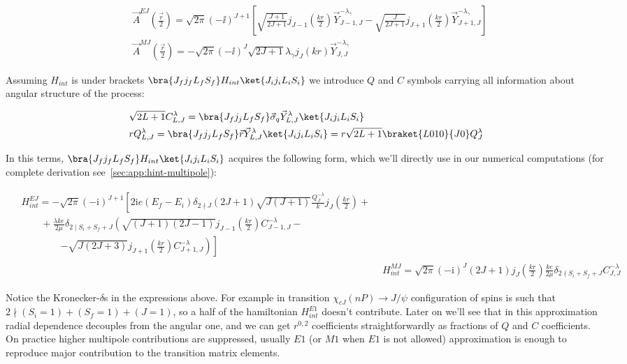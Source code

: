 \begin{align}
    &\vec{A}^{EJ}(\frac{\vec{r}}{2}) = \sqrt{2\pi} (-\ii)^{J+1} \left[ \sqrt{\frac{J+1}{2J+1}} j_{J-1}(\frac{kr}{2}) \vec{Y}^{-\lambda_\gamma}_{J-1, J} - \sqrt{\frac{J}{2J+1}} j_{J+1}(\frac{kr}{2}) \vec{Y}^{-\lambda_\gamma}_{J+1, J} \right] \\
    &\vec{A}^{MJ}(\frac{\vec{r}}{2}) = -\sqrt{2\pi} (-\ii)^J \sqrt{2J+1} \lambda_\gamma j_J(k r) \vec{Y}^{-\lambda_\gamma}_{J,J}
\end{align}

Assuming $H_{int}$ is under brackets $\bra{J_f j_f L_f S_f} H_{int} \ket{J_i j_i L_i S_i}$  we introduce $Q$ and $C$ symbols carrying all information about angular structure of the process:

\begin{align}
    &\sqrt{2L+1} C^\lambda_{L, J} = \bra{J_f j_j L_f S_f} \vec{\sigma}_q \vec{Y}^{\lambda}_{L, J} \ket{J_i j_i L_i S_i} \\
    &r Q^{\lambda}_{L, J} = \bra{J_f j_j L_f S_f} \vec{r} \vec{Y}^{\lambda}_{L, J} \ket{J_i j_i L_i S_i} = r \sqrt{2L+1} \braket{L010}{J0} Q^\lambda_J
\end{align}

In this terms, $\bra{J_f j_f L_f S_f} H_{int} \ket{J_i j_i L_i S_i}$ acquires the following form, which we'll directly use in our numerical computations (for complete derivation see~\cref{sec:app:hint-multipole}):

\begin{align}
    \begin{split}
        &H_{int}^{EJ} = -\sqrt{2\pi} (- \mathrm{i})^{J+1} \left[ 2 \mathrm{i} e (E_f-E_i) \delta_{2 \nmid J} (2J+1) \sqrt{J(J+1)} \frac{Q_{J}^{- \lambda}}{k} j_{J}(\frac{kr}{2}) + \right.\\
        &\qquad +  \frac{\lambda k e}{2 \mu} \delta_{2 \mid S_i + S_f + J} \left(  \sqrt{(J+1)(2J-1)} j_{J-1}(\frac{kr}{2}) C_{J-1, J}^{- \lambda} -\right. \\
        &\qquad\qquad\left.\left.- \sqrt{J(2J+3)} j_{J+1}(\frac{kr}{2}) C_{J+1, J}^{- \lambda} \right) \right]
    \end{split} \\
    &H_{int}^{MJ} = \sqrt{2\pi} (- \mathrm{i})^{J} (2J+1) j_J(\frac{kr}{2}) \frac{k e}{2 \mu} \delta_{2 \nmid S_i + S_f +J} C_{J, J}^{- \lambda}
\end{align}

Notice the Kronecker-$\delta$s in the expressions above. For example in transition $\chi_{cJ}(nP) \rightarrow J/\psi$ configuration of spins is such that $2 \nmid (S_i=1) + (S_f=1) + (J=1)$, so a half of the hamiltonian $H^{E1}_{int}$ doesn't contribute. Later on we'll see that in this approximation radial dependence decouples from the angular one, and we can get $r^{0,2}$ coefficients straightforwardly as fractions of $Q$ and $C$ coefficients. On practice higher multipole contributions are suppressed, usually $E1$ (or $M1$ when $E1$ is not allowed) approximation is enough to reproduce major contribution to the transition matrix elements.
